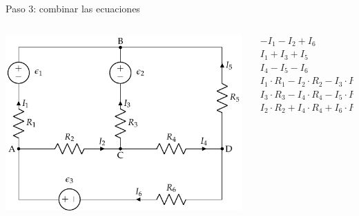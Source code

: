 \documentclass[aspectratio=169, xcolor={usenames,svgnames,dvipsnames}]{beamer}
\begin{document}

\begin{frame}{Paso 3: combinar las ecuaciones}
    \begin{columns}
    \begin{column}{0.5\columnwidth}
    \begin{center}
    \includegraphics[width=.9\linewidth]{../figs/mallas1.pdf}
    \end{center}
    \end{column}
    
    \begin{column}{0.5\columnwidth}
    \begin{align*}
      - I_1 -  I_2 + I_6  &= 0\\
      I_1 + I_3 + I_5 &= 0\\
      I_4 - I_5 - I_6 &= 0\\
      I_1 \cdot R_1 - I_2 \cdot R_2 - I_3 \cdot R_3 &= \epsilon_1 - \epsilon_2\\
      I_3 \cdot R_3 - I_4 \cdot R_4 -I_5 \cdot R_5 &= \epsilon_2\\
      I_2 \cdot R_2 + I_4 \cdot R_4 + I_6 \cdot R_6 &= \epsilon_3
    \end{align*}
    \end{column}
    \end{columns}
\end{frame}

\end{document}
